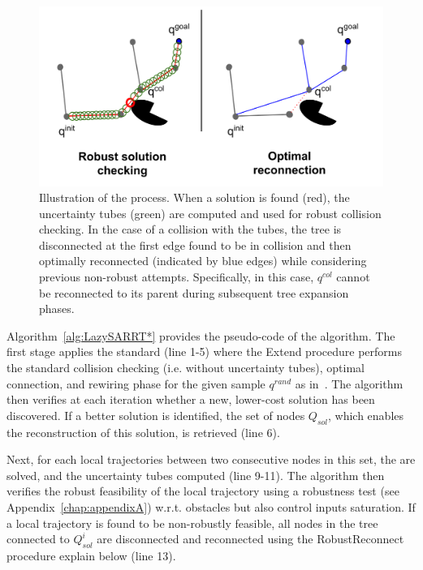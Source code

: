 \begin{figure} [h!]
    \centering
    \includegraphics[width=0.8\linewidth]{figures/samp/lazyrrtstar.png} 
    \caption{Illustration of the  process.
    When a solution is found (red), the uncertainty tubes (green) are computed and used for robust collision checking.
    In the case of a collision with the tubes, the tree is disconnected at the first edge found to be in collision and then optimally reconnected (indicated by blue edges) while considering previous non-robust attempts. 
    Specifically, in this case, $q^{col}$ cannot be reconnected to its parent during subsequent tree expansion phases.
    }%
    \label{fig:lazysarrt*}%
\end{figure}

Algorithm~\ref{alg:LazySARRT*} provides the pseudo-code of the  algorithm.
The first stage applies the standard  (line 1-5) where the Extend procedure performs the standard collision checking (i.e. without uncertainty tubes), optimal connection, and rewiring phase for the given sample  $q^{rand}$ as in~\cite{cRRTstar}.
The algorithm then verifies at each iteration whether a new, lower-cost solution has been discovered. 
If a better solution is identified, the set of nodes $Q_{sol}$, which enables the reconstruction of this solution, is retrieved (line 6).

Next, for each local trajectories between two consecutive nodes in this set, the  are solved, and the uncertainty tubes computed (line 9-11).
The algorithm then verifies the robust feasibility of the local trajectory using a robustness test (see Appendix~\ref{chap:appendixA}) w.r.t. obstacles but also control inputs saturation. 
If a local trajectory is found to be non-robustly feasible, all nodes in the tree connected to $Q_{sol}^i$ are disconnected and reconnected using the RobustReconnect procedure explain below (line 13).

